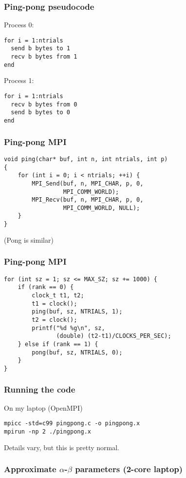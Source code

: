 \documentclass{beamer}
\begin{document}
\begin{frame}[fragile]
  \frametitle{Ping-pong pseudocode}

Process 0:
\begin{verbatim}
for i = 1:ntrials
  send b bytes to 1
  recv b bytes from 1
end
\end{verbatim}

Process 1:
\begin{verbatim}
for i = 1:ntrials
  recv b bytes from 0
  send b bytes to 0
end
\end{verbatim}

\end{frame}


\begin{frame}[fragile]
  \frametitle{Ping-pong MPI}

\begin{verbatim}
void ping(char* buf, int n, int ntrials, int p)
{
    for (int i = 0; i < ntrials; ++i) {
        MPI_Send(buf, n, MPI_CHAR, p, 0, 
                 MPI_COMM_WORLD);
        MPI_Recv(buf, n, MPI_CHAR, p, 0, 
                 MPI_COMM_WORLD, NULL);
    }
}
\end{verbatim}
(Pong is similar)

\end{frame}


\begin{frame}[fragile]
  \frametitle{Ping-pong MPI}

\begin{verbatim}
for (int sz = 1; sz <= MAX_SZ; sz += 1000) {
    if (rank == 0) {
        clock_t t1, t2;
        t1 = clock();
        ping(buf, sz, NTRIALS, 1);
        t2 = clock();
        printf("%d %g\n", sz, 
               (double) (t2-t1)/CLOCKS_PER_SEC);
    } else if (rank == 1) {
        pong(buf, sz, NTRIALS, 0);
    }
}
\end{verbatim}
\end{frame}


\begin{frame}[fragile]
  \frametitle{Running the code}

On my laptop (OpenMPI)
\begin{verbatim}
mpicc -std=c99 pingpong.c -o pingpong.x
mpirun -np 2 ./pingpong.x
\end{verbatim}
Details vary, but this is pretty normal.

\end{frame}


\begin{frame}
  \frametitle{Approximate $\alpha$-$\beta$ parameters (2-core laptop)}

  \begin{center}
  
  \end{center}
\end{frame}
\end{document}
